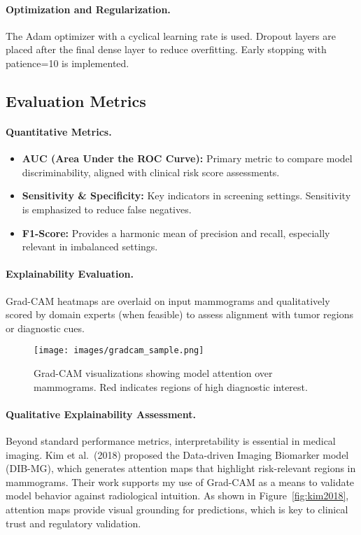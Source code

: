 \documentclass[12pt]{article}
\begin{document}
\paragraph{Optimization and Regularization.}
The Adam optimizer with a cyclical learning rate is used. Dropout layers are placed after the final dense layer to reduce overfitting. Early stopping with patience=10 is implemented.

\vspace{1em}

\subsection{Evaluation Metrics}

\paragraph{Quantitative Metrics.}
\begin{itemize}
    \item \textbf{AUC (Area Under the ROC Curve):} Primary metric to compare model discriminability, aligned with clinical risk score assessments.
    \item \textbf{Sensitivity \& Specificity:} Key indicators in screening settings. Sensitivity is emphasized to reduce false negatives.
    \item \textbf{F1-Score:} Provides a harmonic mean of precision and recall, especially relevant in imbalanced settings.
\end{itemize}

\paragraph{Explainability Evaluation.}
Grad-CAM heatmaps are overlaid on input mammograms and qualitatively scored by domain experts (when feasible) to assess alignment with tumor regions or diagnostic cues.

\begin{figure}[H]
    \centering
    \texttt{[image: images/gradcam\_sample.png]}
    \caption{Grad-CAM visualizations showing model attention over mammograms. Red indicates regions of high diagnostic interest.}
\end{figure}

\paragraph{Qualitative Explainability Assessment.}
Beyond standard performance metrics, interpretability is essential in medical imaging. Kim et al.\ (2018) proposed the Data-driven Imaging Biomarker model (DIB-MG), which generates attention maps that highlight risk-relevant regions in mammograms. Their work supports my use of Grad-CAM as a means to validate model behavior against radiological intuition. As shown in Figure~\ref{fig:kim2018}, attention maps provide visual grounding for predictions, which is key to clinical trust and regulatory validation.
\end{document}
